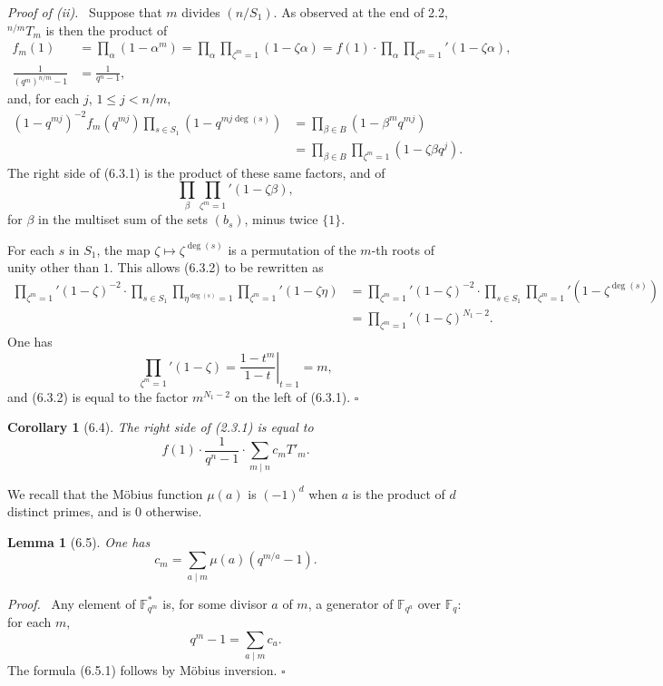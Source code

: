 \documentclass[10pt]{article}
\newcommand{\Fq}{\mathbb F_q}
\newcommand{\Fb}{\mathbb F}
\newcommand{\degm}{\operatorname{deg}}
\theoremstyle{deligne}
\newtheorem*{lemma*}{Lemma}
\newtheorem*{corollary*}{Corollary}
\newenvironment{proofdel}[1][Proof.]{\textit{#1}\ }{\hfill$\square$}
\begin{document}
\begin{proofdel}[Proof of (ii).]
Suppose that $m$ divides $(n/S_1)$. As observed at the end of 2.2, ${}^{n/m}T_m$ is then the product of
\begin{align*}
f_m(1)&=\prod_\alpha(1-\alpha^m)=\prod_\alpha\prod_{\zeta^m=1}(1-\zeta\alpha)
      =f(1)\cdot\prod_\alpha\prod_{\zeta^m=1}'(1-\zeta\alpha),\\
\frac{1}{(q^m)^{n/m}-1}&=\frac{1}{q^n-1},
\end{align*}
and, for each $j$, $1\le j<n/m$,
\begin{align*}
(1-q^{mj})^{-2}f_m(q^{mj})\prod_{s\in S_1}(1-q^{mj\degm(s)})
&=\prod_{\beta\in B}(1-\beta^m q^{mj})\\
&=\prod_{\beta\in B}\prod_{\zeta^m=1}(1-\zeta\beta q^j).
\end{align*}
The right side of (6.3.1) is the product of these same factors, and of
\begin{equation}\tag{6.3.2}
\prod_\beta\prod_{\zeta^m=1}'(1-\zeta\beta),
\end{equation}
for $\beta$ in the multiset sum of the sets $(b_s)$, minus twice $\{1\}$.

For each $s$ in $S_1$, the map $\zeta\mapsto\zeta^{\degm(s)}$ is a permutation of the $m$-th roots of unity other than $1$. This allows (6.3.2) to be rewritten as
\begin{align*}
\prod_{\zeta^m=1}'(1-\zeta)^{-2}\cdot
\prod_{s\in S_1}\prod_{\eta^{\degm(s)}=1}\prod_{\zeta^m=1}'(1-\zeta\eta)
&=\prod_{\zeta^m=1}'(1-\zeta)^{-2}\cdot
\prod_{s\in S_1}\prod_{\zeta^m=1}'(1-\zeta^{\degm(s)})\\
&=\prod_{\zeta^m=1}'(1-\zeta)^{N_1-2}.
\end{align*}
One has
\[
\prod_{\zeta^m=1}'(1-\zeta)=\left.\frac{1-t^m}{1-t}\right|_{t=1}=m,
\]
and (6.3.2) is equal to the factor $m^{N_1-2}$ on the left of (6.3.1).
\end{proofdel}

\begin{corollary*}[6.4]
The right side of (2.3.1) is equal to
\begin{equation}\tag{6.4.1}
f(1)\cdot\frac{1}{q^n-1}\cdot\sum_{m\mid n}c_mT'_m.
\end{equation}
\end{corollary*}

We recall that the Möbius function $\mu(a)$ is $(-1)^d$ when $a$ is the product of $d$ distinct primes, and is $0$ otherwise.

\begin{lemma*}[6.5]
One has
\begin{equation}\tag{6.5.1}
c_m=\sum_{a\mid m}\mu(a)(q^{m/a}-1).
\end{equation}
\end{lemma*}
\begin{proofdel}
Any element of $\Fb_{q^m}^*$ is, for some divisor $a$ of $m$, a generator of $\Fb_{q^a}$ over $\Fq$: for each $m$,
\[
q^m-1=\sum_{a\mid m}c_a.
\]
The formula (6.5.1) follows by Möbius inversion.
\end{proofdel}
\end{document}
